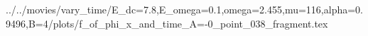 ../../movies/vary_time/E_dc=7.8,E_omega=0.1,omega=2.455,mu=116,alpha=0.9496,B=4/plots/f_of_phi_x_and_time_A=-0_point_038_fragment.tex